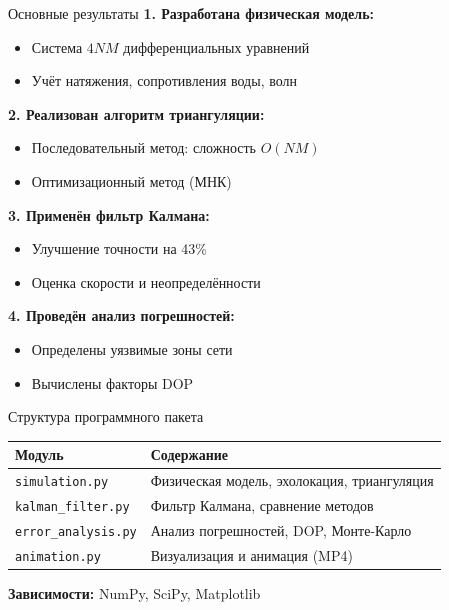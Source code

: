 \documentclass[aspectratio=169, 12pt]{beamer}
\begin{document}
\begin{frame}{Основные результаты}
    \textbf{1. Разработана физическая модель:}
    \begin{itemize}
        \item Система $4NM$ дифференциальных уравнений
        \item Учёт натяжения, сопротивления воды, волн
    \end{itemize}
    
    \vspace{0.2cm}
    \textbf{2. Реализован алгоритм триангуляции:}
    \begin{itemize}
        \item Последовательный метод: сложность $O(NM)$
        \item Оптимизационный метод (МНК)
    \end{itemize}
    
    \vspace{0.2cm}
    \textbf{3. Применён фильтр Калмана:}
    \begin{itemize}
        \item Улучшение точности на 43\%
        \item Оценка скорости и неопределённости
    \end{itemize}
    
    \vspace{0.2cm}
    \textbf{4. Проведён анализ погрешностей:}
    \begin{itemize}
        \item Определены уязвимые зоны сети
        \item Вычислены факторы DOP
    \end{itemize}
\end{frame}

\begin{frame}{Структура программного пакета}
    \begin{table}
        \centering
        \begin{tabular}{lp{8cm}}
            \toprule
            \textbf{Модуль} & \textbf{Содержание} \\
            \midrule
            \texttt{simulation.py} & Физическая модель, эхолокация, триангуляция \\
            \texttt{kalman\_filter.py} & Фильтр Калмана, сравнение методов \\
            \texttt{error\_analysis.py} & Анализ погрешностей, DOP, Монте-Карло \\
            \texttt{animation.py} & Визуализация и анимация (MP4) \\
            \bottomrule
        \end{tabular}
    \end{table}
    
    \vspace{0.5cm}
    \textbf{Зависимости:} NumPy, SciPy, Matplotlib
\end{frame}
\end{document}
